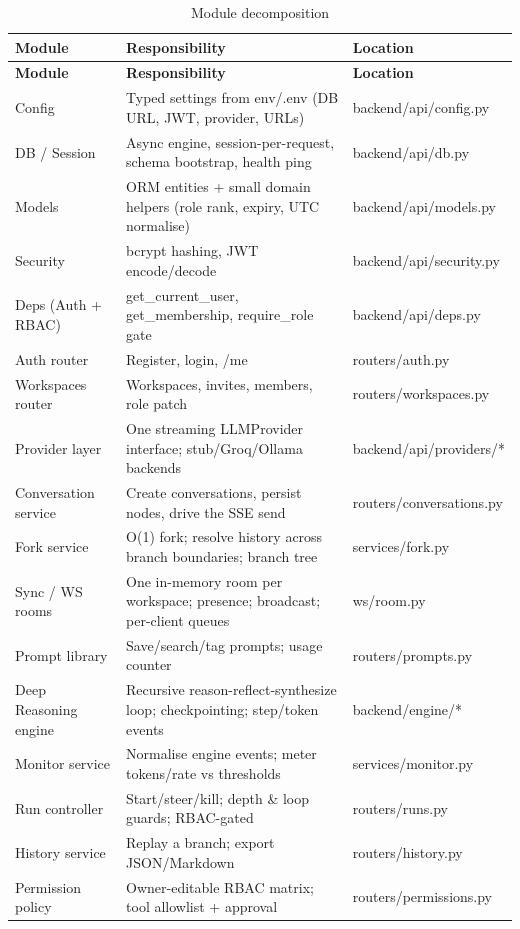 \documentclass[12pt,a4paper]{report}
\begin{document}
\begingroup
\setlength{\parskip}{0pt}\renewcommand{\arraystretch}{1.32}\footnotesize
\begin{xltabular}{\textwidth}{>{\hsize\raggedright\arraybackslash}X >{\hsize\raggedright\arraybackslash}X >{\hsize\raggedright\arraybackslash}X}
\caption{Module decomposition}\\
\toprule
\textbf{Module} & \textbf{Responsibility} & \textbf{Location} \\
\midrule\endfirsthead
\toprule
\textbf{Module} & \textbf{Responsibility} & \textbf{Location} \\
\midrule\endhead
\bottomrule\endfoot
Config & Typed settings from env/.env (DB URL, JWT, provider, URLs) & backend/api/config.py \\
DB / Session & Async engine, session-per-request, schema bootstrap, health ping & backend/api/db.py \\
Models & ORM entities + small domain helpers (role rank, expiry, UTC normalise) & backend/api/models.py \\
Security & bcrypt hashing, JWT encode/decode & backend/api/security.py \\
Deps (Auth + RBAC) & get\_current\_user, get\_membership, require\_role gate & backend/api/deps.py \\
Auth router & Register, login, /me & routers/auth.py \\
Workspaces router & Workspaces, invites, members, role patch & routers/workspaces.py \\
Provider layer & One streaming LLMProvider interface; stub/Groq/Ollama backends & backend/api/providers/* \\
Conversation service & Create conversations, persist nodes, drive the SSE send & routers/conversations.py \\
Fork service & O(1) fork; resolve history across branch boundaries; branch tree & services/fork.py \\
Sync / WS rooms & One in-memory room per workspace; presence; broadcast; per-client queues & ws/room.py \\
Prompt library & Save/search/tag prompts; usage counter & routers/prompts.py \\
Deep Reasoning engine & Recursive reason-reflect-synthesize loop; checkpointing; step/token events & backend/engine/* \\
Monitor service & Normalise engine events; meter tokens/rate vs thresholds & services/monitor.py \\
Run controller & Start/steer/kill; depth \& loop guards; RBAC-gated & routers/runs.py \\
History service & Replay a branch; export JSON/Markdown & routers/history.py \\
Permission policy & Owner-editable RBAC matrix; tool allowlist + approval & routers/permissions.py \\
\end{xltabular}
\endgroup
\end{document}
